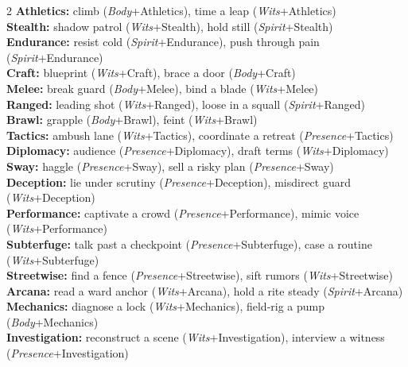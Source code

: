 \begin{tcolorbox}[title=Common Rolls (GM Screen Reference), colback=white!97!gray, colframe=black!80!gray,breakable]
\begin{multicols}{2}
\textbf{Athletics:} climb (\emph{Body}+Athletics), time a leap (\emph{Wits}+Athletics)\\
\textbf{Stealth:} shadow patrol (\emph{Wits}+Stealth), hold still (\emph{Spirit}+Stealth)\\
\textbf{Endurance:} resist cold (\emph{Spirit}+Endurance), push through pain (\emph{Spirit}+Endurance)\\
\textbf{Craft:} blueprint (\emph{Wits}+Craft), brace a door (\emph{Body}+Craft)\\
\textbf{Melee:} break guard (\emph{Body}+Melee), bind a blade (\emph{Wits}+Melee)\\
\textbf{Ranged:} leading shot (\emph{Wits}+Ranged), loose in a squall (\emph{Spirit}+Ranged)\\
\textbf{Brawl:} grapple (\emph{Body}+Brawl), feint (\emph{Wits}+Brawl)\\
\textbf{Tactics:} ambush lane (\emph{Wits}+Tactics), coordinate a retreat (\emph{Presence}+Tactics)\\
\textbf{Diplomacy:} audience (\emph{Presence}+Diplomacy), draft terms (\emph{Wits}+Diplomacy)\\
\textbf{Sway:} haggle (\emph{Presence}+Sway), sell a risky plan (\emph{Presence}+Sway)\\
\textbf{Deception:} lie under scrutiny (\emph{Presence}+Deception), misdirect guard (\emph{Wits}+Deception)\\
\textbf{Performance:} captivate a crowd (\emph{Presence}+Performance), mimic voice (\emph{Wits}+Performance)\\
\textbf{Subterfuge:} talk past a checkpoint (\emph{Presence}+Subterfuge), case a routine (\emph{Wits}+Subterfuge)\\
\textbf{Streetwise:} find a fence (\emph{Presence}+Streetwise), sift rumors (\emph{Wits}+Streetwise)\\
\textbf{Arcana:} read a ward anchor (\emph{Wits}+Arcana), hold a rite steady (\emph{Spirit}+Arcana)\\
\textbf{Mechanics:} diagnose a lock (\emph{Wits}+Mechanics), field-rig a pump (\emph{Body}+Mechanics)\\
\textbf{Investigation:} reconstruct a scene (\emph{Wits}+Investigation), interview a witness (\emph{Presence}+Investigation)\\

\end{multicols}
\end{tcolorbox}
